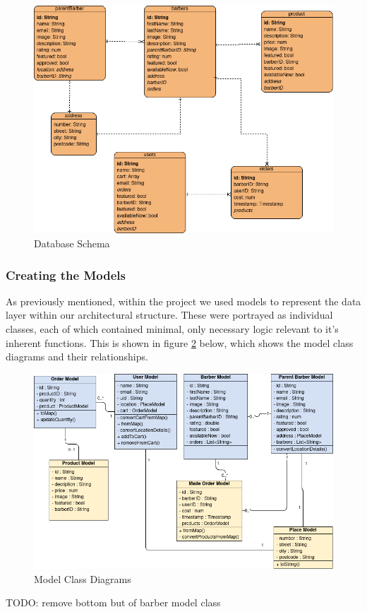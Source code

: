 \documentclass[12pt]{article}
\begin{document}
	\begin{figure}[H]
		\centering
		\includegraphics[scale=0.6]{images/database-schema.png}
		\caption{Database Schema}
		\label{fig:database-schema}
	\end{figure}

	\subsubsection{Creating the Models}
	As previously mentioned, within the project we used models to represent the data layer within our architectural structure. These were portrayed as individual classes, each of which contained minimal, only necessary logic relevant to it's inherent functions. This is shown in figure \ref{fig:model-class-diagrams} below, which shows the model class diagrams and their relationships.
	
	\begin{figure}[H]
		\centering
		\includegraphics[scale=0.6]{images/model-class-diagrams.png}
		\caption{Model Class Diagrams}
		\label{fig:model-class-diagrams}
	\end{figure}
	TODO: remove bottom but of barber model class
\end{document}

